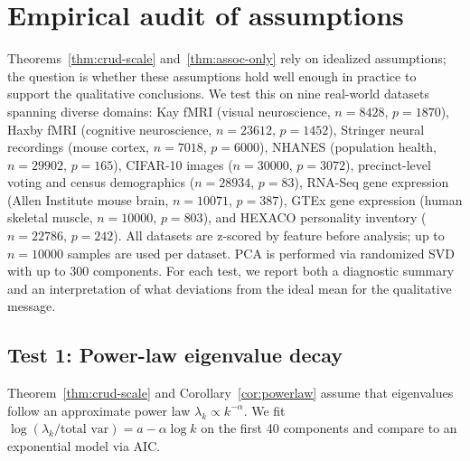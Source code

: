 \section{Empirical audit of assumptions}
\label{app:assumption-audit}

Theorems~\ref{thm:crud-scale} and~\ref{thm:assoc-only} rely on idealized assumptions;
the question is whether these assumptions hold well enough in practice to support the
qualitative conclusions.
We test this on nine real-world datasets spanning diverse domains: Kay fMRI (visual neuroscience,
$n{=}8428$, $p{=}1870$), Haxby fMRI (cognitive neuroscience, $n{=}23612$, $p{=}1452$),
Stringer neural recordings (mouse cortex, $n{=}7018$, $p{=}6000$),
NHANES (population health, $n{=}29902$, $p{=}165$),
CIFAR-10 images ($n{=}30000$, $p{=}3072$),
precinct-level voting and census demographics ($n{=}28934$, $p{=}83$),
RNA-Seq gene expression (Allen Institute mouse brain, $n{=}10071$, $p{=}387$),
GTEx gene expression (human skeletal muscle, $n{=}10000$, $p{=}803$), and
HEXACO personality inventory ($n{=}22786$, $p{=}242$).
All datasets are z-scored by feature before analysis; up to $n{=}10000$ samples are
used per dataset. PCA is performed via randomized SVD with up to 300 components.
For each test, we report both a diagnostic summary and an interpretation of what
deviations from the ideal mean for the qualitative message.

\subsection{Test 1: Power-law eigenvalue decay}

Theorem~\ref{thm:crud-scale} and Corollary~\ref{cor:powerlaw} assume that eigenvalues
follow an approximate power law $\lambda_k \propto k^{-\alpha}$.
We fit $\log(\lambda_k/\text{total var}) = a - \alpha \log k$ on the first 40 components
and compare to an exponential model via AIC.

